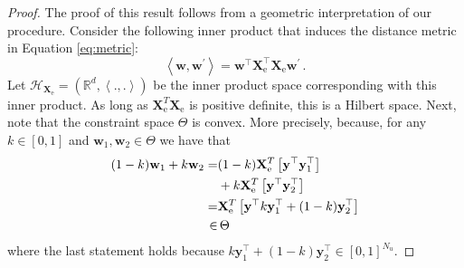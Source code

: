 \documentclass[twoside]{memoir}\usepackage[]{graphicx}\usepackage{xcolor}
\newcommand{\Xe}{\mathbf{X}_\mathrm{e}  }
\newcommand{\XeT}{\mathbf{X}_\mathrm{e}^T}
\let\G\relax
\newcommand{\G}{\left(\Xe^T \Xe \right)^{-1}}
\renewcommand{\vec}{\mathbf}
\begin{document}
\begin{proof}
The proof of this result follows from a geometric interpretation of our procedure. Consider the following inner product that induces the distance metric in Equation \eqref{eq:metric}:
\begin{equation}
\left\langle \vec{w}, \vec{w}^\prime \right\rangle = \vec{w}^\top \vec{X}_\text{e}^\top \vec{X}_\text{e} \vec{w}^\prime \,. \nonumber
\end{equation}
Let $\mathcal{H}_{\vec{X}_\text{e}} = ( \mathbb{R}^d,\left\langle ., . \right\rangle )$ be the inner product space corresponding with this inner product. As long as $\XeT \Xe$ is positive definite, this is a Hilbert space. Next, note that the constraint space $\Theta$ is convex. More precisely, because, for any $k \in [0,1]$ and $\vec{w}_\text{1},\vec{w}_\text{2} \in \Theta$ we have that
\begin{align}
(1-k) \vec{w}_\text{1} + k \vec{w}_\text{2}  = & (1-k) \G \XeT \left[\vec{y}^\top \vec{y}_\text{1}^\top \right] \nonumber \\
 & + k \G \XeT \left[\vec{y}^\top \vec{y}_\text{2}^\top \right] \nonumber \\ 
 = & \G \XeT \left[\vec{y}^\top k \vec{y}_\text{1}^\top + (1-k) \vec{y}_\text{2}^\top \right] \nonumber \\
 \in & \, \Theta \nonumber
\end{align}
where the last statement holds because $k \vec{y}_\text{1}^\top + (1-k) \vec{y}_\text{2}^\top \in [0,1]^{N_u}$.


\end{proof}
\end{document}
